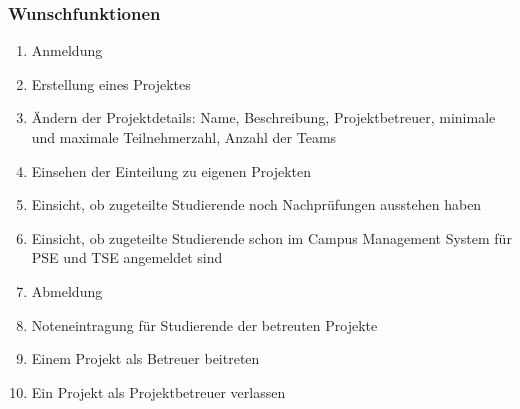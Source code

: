 \documentclass[parskip=full]{scrartcl}
\newcommand{\swtLabel}[1]{\textbf{/#1\arabic*0/}}
\begin{document}
\subsubsection{Wunschfunktionen}
\begin{enumerate}[label=\swtLabel{FA}, resume]
  \item Anmeldung
  \item Erstellung eines Projektes
  \item Ändern der Projektdetails: Name, Beschreibung, Projektbetreuer, minimale
und maximale Teilnehmerzahl, Anzahl der Teams
\item Einsehen der Einteilung zu eigenen Projekten
\item Einsicht, ob zugeteilte Studierende noch Nachprüfungen ausstehen haben
\item Einsicht, ob zugeteilte Studierende schon im Campus Management System für
PSE und TSE angemeldet sind
\item Abmeldung
\item Noteneintragung für Studierende der betreuten Projekte
\item Einem Projekt als Betreuer beitreten
\item Ein Projekt als Projektbetreuer verlassen
\end{enumerate}





\end{document}
